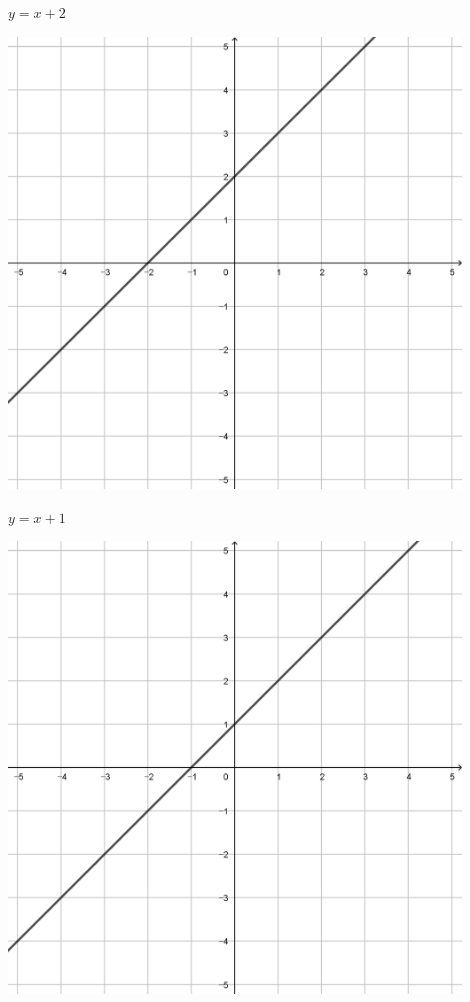 \documentclass[a4paper]{oblivoir}
\begin{document}
\clearpage
\begin{minipage}{0.45\textwidth}\centering
\(y=x+2\)
\par\bigskip\includegraphics[width=0.9\textwidth]{img/1_line_5}
\end{minipage}
\begin{minipage}{0.45\textwidth}\centering
\(y=x+1\)
\par\bigskip\includegraphics[width=0.9\textwidth]{img/1_line_6}
\end{minipage}\bigskip\bigskip\par
\end{document}

